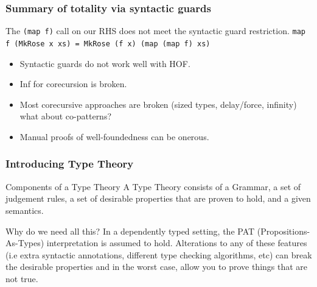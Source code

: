 \documentclass
  [hyperref={colorlinks = true,linkcolor = blue, 
             citecolor = blue, urlcolor = blue}
  ]{beamer}
\begin{document}
\begin{frame}[fragile]
  \frametitle{Summary of totality via syntactic guards}
  \begin{block}{The \texttt{(map f)} call on our RHS does not
    meet the syntactic guard restriction.}
  \texttt{map f (MkRose x xs) = MkRose (f x) (map (map f) xs)}
  \end{block}
  \begin{itemize}
    \item Syntactic guards do not work well with HOF.
    \item Inf for corecursion is broken.
    \item Most corecursive approaches are broken (sized types,
    delay/force, infinity) what about co-patterns?
    \item Manual proofs of well-foundedness can be onerous.
  \end{itemize}
\end{frame}

\begin{frame}[fragile]
  \frametitle{Introducing Type Theory}
  \begin{block}{Components of a Type Theory}
  A Type Theory consists of a Grammar, a set of judgement rules, 
  a set of desirable properties that are proven to hold, and
  a given semantics.
  \end{block}
  \begin{block}{Why do we need all this?}
  In a dependently typed setting, the PAT (Propositions-As-Types)
  interpretation is assumed to hold. Alterations to any of these
  features (i.e extra syntactic annotations, different type
  checking algorithms, etc) can break the desirable properties
  and in the worst case, allow you to prove things that are not
  true.
  \end{block}

\end{frame}
\end{document}
